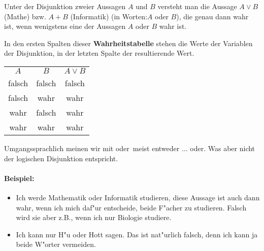 \begin{definition}[Disjunktion]
Unter der Disjunktion zweier Aussagen $A$ und $B$ versteht man die Aussage $A \lor B$ (Mathe) bzw. $A + B$ (Informatik) (in Worten:\glqq $A$ oder $B$\grqq ), die genau dann wahr ist, wenn wenigstens eine der Aussagen $A$ oder $B$ wahr ist.
\end{definition}
In den ersten Spalten dieser \textbf{Wahrheitstabelle} stehen die Werte der Variablen der Disjunktion, in der letzten Spalte der resultierende Wert.
\begin{center}
\begin{tabular}{c|c||c}
$A$& $B$  &  $A \lor B$  \\ 
 \cellcolor{ared}falsch & \cellcolor{ared} falsch & \cellcolor{ared}falsch   \\ 
 \cellcolor{ared}falsch & \cellcolor{agreen}wahr & \cellcolor{agreen}wahr  \\ 
 \cellcolor{agreen}wahr & \cellcolor{ared} falsch & \cellcolor{agreen}wahr   \\ 
\cellcolor{agreen}wahr & \cellcolor{agreen}wahr & \cellcolor{agreen}wahr  \\ 
\hline
\end{tabular}
\end{center}
\begin{warning}
	Umgangssprachlich meinen wir mit \glqq oder\grqq \ meist \glqq entweder $\ldots$ oder\grqq . Was aber nicht der logischen Disjunktion entspricht.
\end{warning}

\paragraph*{Beispiel:}
\begin{itemize}
	\item \glqq Ich werde Mathematik oder Informatik studieren\grqq , diese Aussage ist auch dann wahr, wenn ich mich daf"ur entscheide, beide F"acher zu studieren. Falsch wird sie aber z.B., wenn ich nur Biologie studiere.
	\item \glqq Ich kann nur H"u oder Hott sagen\grqq . Das ist nat"urlich falsch, denn ich kann ja beide W"orter vermeiden.
\end{itemize}

